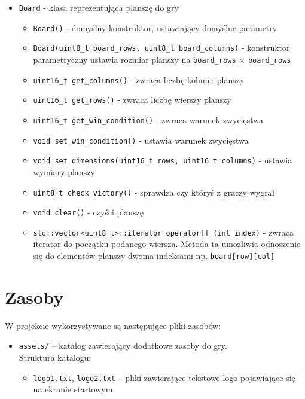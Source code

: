\documentclass{article}
\begin{document}
\begin{itemize}
    \item \texttt{Board} - klasa reprezentująca planszę do gry
        \begin{itemize}
            \item \texttt{Board()} - domyślny konstruktor, ustawiający domyślne parametry
            \item \texttt{Board(uint8\_t board\_rows, uint8\_t board\_columns)} - konstruktor parametryczny ustawia 
            rozmiar planszy na \texttt{board\_rows} $\times$ \texttt{board\_rows}
            \item \texttt{uint16\_t get\_columns()} - zwraca liczbę kolumn planszy
            \item \texttt{uint16\_t get\_rows()} - zwraca liczbę wierszy planszy
            \item \texttt{uint16\_t get\_win\_condition()} - zwraca warunek zwycięstwa
            \item \texttt{void set\_win\_condition()} - ustawia warunek zwycięstwa
            \item \texttt{void set\_dimensions(uint16\_t rows, uint16\_t columns)} - ustawia wymiary planszy
            \item \texttt{uint8\_t check\_victory()} - sprawdza czy któryś z graczy wygrał
            \item \texttt{void clear()} - czyści planszę
            \item \texttt{std::vector<uint8\_t>::iterator operator[] (int index)} - zwraca iterator do początku podanego
            wiersza. Metoda ta umożliwia odnoszenie się do elementów planszy dwoma indeksami 
            np. \texttt{board[row][col]}
        \end{itemize}
\end{itemize}
     
\section{Zasoby}

W projekcie wykorzystywane są następujące pliki zasobów:
    \begin{itemize}
    \item \texttt{assets/} – katalog zawierający dodatkowe zasoby do gry.\\
    Struktura katalogu:
        \begin{itemize}
            \item \texttt{logo1.txt}, \texttt{logo2.txt} – pliki zawierające tekstowe logo pojawiające się na ekranie 
            startowym.
        \end{itemize}
    \end{itemize}
\end{document}
